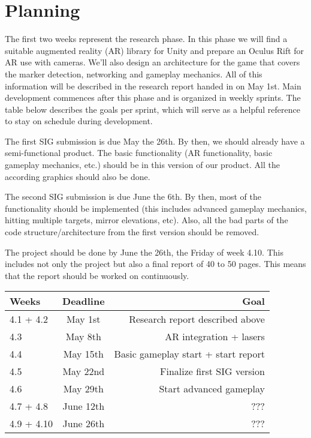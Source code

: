 \section{Planning}

The first two weeks represent the research phase. In this phase we will find a suitable augmented reality (AR) library for Unity and prepare an Oculus Rift for AR use with cameras. We'll also design an architecture for the game that covers the marker detection, networking and gameplay mechanics. All of this information will be described in the research report handed in on May 1st. Main development commences after this phase and is organized in weekly sprints. The table below describes the goals per sprint, which will serve as a helpful reference to stay on schedule during development.

The first SIG submission is due May the 26th. By then, we should already have a semi-functional product. The basic functionality (AR functionality, basic gameplay mechanics, etc.) should be in this version of our product. All the according graphics should also be done.

The second SIG submission is due June the 6th. By then, most of the functionality should be implemented (this includes advanced gameplay mechanics, hitting multiple targets, mirror elevations, etc). Also, all the bad parts of the code structure/architecture from the first version should be removed.

The project should be done by June the 26th, the Friday of week 4.10. This includes not only the project but also a final report of 40 to 50 pages. This means that the report should be worked on continuously.

\begin{tabular}{|l|c|r|}
	\hline
	Weeks & Deadline & Goal \\ \hline
	4.1 + 4.2 & May 1st & Research report described above \\ \hline
	4.3 & May 8th & AR integration + lasers \\ \hline
	4.4 & May 15th & Basic gameplay start + start report \\ \hline
	4.5 & May 22nd & Finalize first SIG version \\ \hline
	4.6 & May 29th & Start advanced gameplay \\ \hline
	4.7 + 4.8 & June 12th & ??? \\ \hline
	4.9 + 4.10 & June 26th & ??? \\ \hline
\end{tabular}